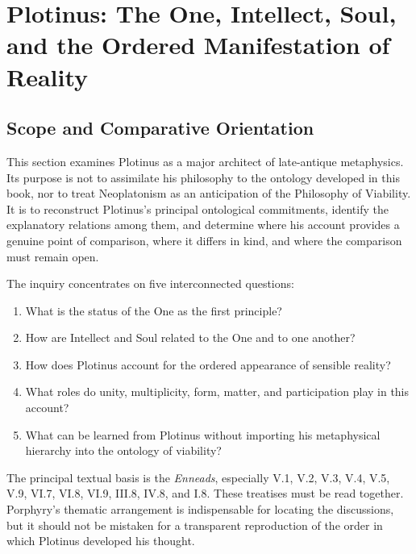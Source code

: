
\section{Plotinus: The One, Intellect, Soul, and the Ordered Manifestation of Reality}
\label{sec:ch08-plotinus}

\subsection*{Scope and Comparative Orientation}

This section examines Plotinus as a major architect of late-antique
metaphysics. Its purpose is not to assimilate his philosophy to the
ontology developed in this book, nor to treat Neoplatonism as an
anticipation of the Philosophy of Viability. It is to reconstruct
Plotinus's principal ontological commitments, identify the explanatory
relations among them, and determine where his account provides a
genuine point of comparison, where it differs in kind, and where the
comparison must remain open.

The inquiry concentrates on five interconnected questions:

\begin{enumerate}
    \item What is the status of the One as the first principle?
    \item How are Intellect and Soul related to the One and to one
    another?
    \item How does Plotinus account for the ordered appearance of
    sensible reality?
    \item What roles do unity, multiplicity, form, matter, and
    participation play in this account?
    \item What can be learned from Plotinus without importing his
    metaphysical hierarchy into the ontology of viability?
\end{enumerate}

The principal textual basis is the \textit{Enneads}, especially
V.1, V.2, V.3, V.4, V.5, V.9, VI.7, VI.8, VI.9, III.8, IV.8,
and I.8. These treatises must be read together. Porphyry's thematic
arrangement is indispensable for locating the discussions, but it
should not be mistaken for a transparent reproduction of the order
in which Plotinus developed his thought.

